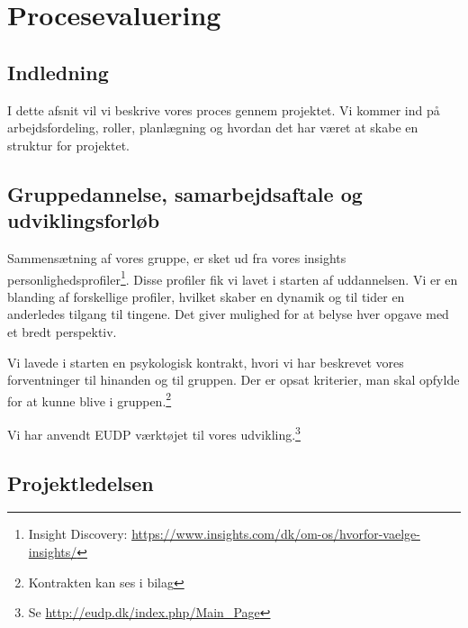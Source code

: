 \chapter{Procesevaluering}
\label{cha:procesevaluering}

\section{Indledning}
\label{sec:indledning}

I dette afsnit vil vi beskrive vores proces gennem projektet. Vi kommer ind på arbejdsfordeling, roller, planlægning og hvordan det har været at skabe en struktur for projektet.

\section{Gruppedannelse, samarbejdsaftale og udviklingsforløb}
\label{sec:gruppe-dannelse:-}

Sammensætning af vores gruppe, er sket ud fra vores insights personlighedsprofiler\footnote{Insight Discovery: \url{https://www.insights.com/dk/om-os/hvorfor-vaelge-insights/}}. Disse profiler fik vi lavet i starten af uddannelsen. Vi er en blanding af forskellige profiler, hvilket skaber en dynamik og til tider en anderledes tilgang til tingene. Det giver mulighed for at belyse hver opgave med et bredt perspektiv.  


Vi lavede i starten en psykologisk kontrakt, hvori vi har beskrevet vores forventninger til hinanden og til gruppen. Der er opsat kriterier, man skal opfylde for at kunne blive i gruppen.\footnote{Kontrakten kan ses i bilag} %



Vi har anvendt EUDP værktøjet til vores udvikling.\footnote{ Se \url{http://eudp.dk/index.php/Main_Page}}

\section{Projektledelsen}
\label{sec:projektledelsen}

